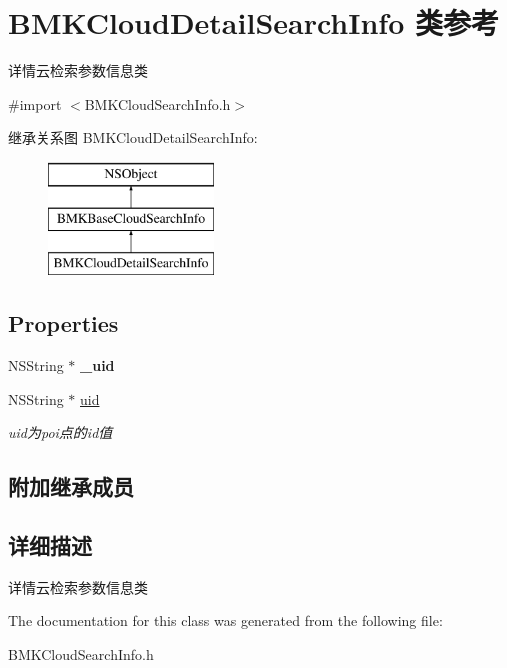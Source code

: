 \hypertarget{interface_b_m_k_cloud_detail_search_info}{\section{B\-M\-K\-Cloud\-Detail\-Search\-Info 类参考}
\label{interface_b_m_k_cloud_detail_search_info}
}


详情云检索参数信息类  




{\ttfamily \#import $<$B\-M\-K\-Cloud\-Search\-Info.\-h$>$}

继承关系图 B\-M\-K\-Cloud\-Detail\-Search\-Info\-:\begin{figure}[H]
\begin{center}
\leavevmode
\includegraphics[height=3.000000cm]{interface_b_m_k_cloud_detail_search_info}
\end{center}
\end{figure}
\subsection*{Properties}
\begin{DoxyCompactItemize}
\item 
\hypertarget{interface_b_m_k_cloud_detail_search_info_af0561e1d6ce5656002bb7b576ac51b4f}{N\-S\-String $\ast$ {\bfseries \-\_\-uid}}\label{interface_b_m_k_cloud_detail_search_info_af0561e1d6ce5656002bb7b576ac51b4f}

\item 
\hypertarget{interface_b_m_k_cloud_detail_search_info_ad553991a75b6d30409a9d3525bea9c52}{N\-S\-String $\ast$ \hyperlink{interface_b_m_k_cloud_detail_search_info_ad553991a75b6d30409a9d3525bea9c52}{uid}}\label{interface_b_m_k_cloud_detail_search_info_ad553991a75b6d30409a9d3525bea9c52}

\begin{DoxyCompactList}\small\item\em uid为poi点的id值 \end{DoxyCompactList}\end{DoxyCompactItemize}
\subsection*{附加继承成员}


\subsection{详细描述}
详情云检索参数信息类 

The documentation for this class was generated from the following file\-:\begin{DoxyCompactItemize}
\item 
B\-M\-K\-Cloud\-Search\-Info.\-h\end{DoxyCompactItemize}
